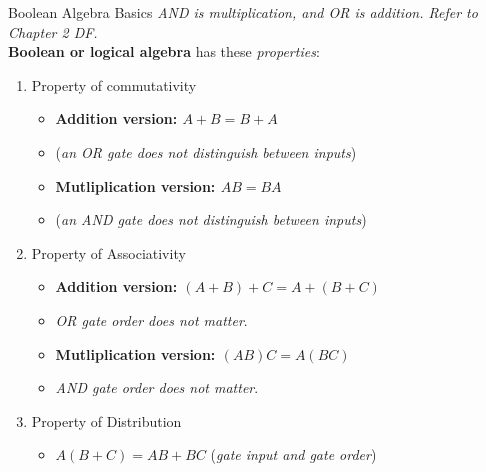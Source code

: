 \documentclass{beamer}
\begin{document}
\begin{frame}{Boolean Algebra Basics}
\small
\textit{AND is multiplication, and OR is addition.  Refer to Chapter 2 DF.} \\ \vspace{0.1cm}
\textbf{Boolean or logical algebra} has these \textit{properties}:
\begin{enumerate}
\item \alert{Property of commutativity}
\begin{itemize}
\item \textbf{Addition version: $A + B = B + A$}
\item (\textit{an OR gate does not distinguish between inputs})
\item \textbf{Mutliplication version: $AB = BA$}
\item (\textit{an AND gate does not distinguish between inputs})
\end{itemize}
\item \alert{Property of Associativity}
\begin{itemize}
\item \textbf{Addition version: $(A+B)+C = A+(B+C)$}
\item \textit{OR gate order does not matter}.
\item \textbf{Mutliplication version: $(AB)C = A(BC)$}
\item \textit{AND gate order does not matter}.
\end{itemize}
\item \alert{Property of Distribution}
\begin{itemize}
\item $A(B+C) = AB+BC$ (\textit{gate input and gate order})
\end{itemize}
\end{enumerate}
\end{frame}
\end{document}
